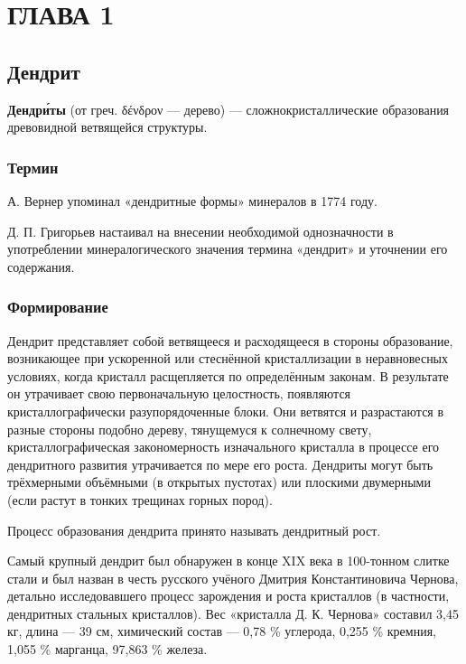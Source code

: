 \chapter{\label{ch:ch01}ГЛАВА 1} %

\section{Дендрит}

\textbf{Дендри́ты} (от греч. δένδρον — дерево) — сложнокристаллические образования древовидной ветвящейся структуры.

\subsection{Термин}

А. Вернер упоминал «дендритные формы» минералов в 1774 году.

Д. П. Григорьев настаивал на внесении необходимой однозначности в употреблении минералогического значения термина «дендрит» и уточнении его содержания.

\subsection{Формирование}

Дендрит представляет собой ветвящееся и расходящееся в стороны образование, возникающее при ускоренной или стеснённой кристаллизации в неравновесных условиях, когда кристалл расщепляется по определённым законам. В результате он утрачивает свою первоначальную целостность, появляются кристаллографически разупорядоченные блоки. Они ветвятся и разрастаются в разные стороны подобно дереву, тянущемуся к солнечному свету, кристаллографическая закономерность изначального кристалла в процессе его дендритного развития утрачивается по мере его роста. Дендриты могут быть трёхмерными объёмными (в открытых пустотах) или плоскими двумерными (если растут в тонких трещинах горных пород).

Процесс образования дендрита принято называть дендритный рост.

Самый крупный дендрит был обнаружен в конце XIX века в 100-тонном слитке стали и был назван в честь русского учёного Дмитрия Константиновича Чернова, детально исследовавшего процесс зарождения и роста кристаллов (в частности, дендритных стальных кристаллов). Вес «кристалла Д. К. Чернова» составил 3,45 кг, длина — 39 см, химический состав — 0,78 \% углерода, 0,255 \% кремния, 1,055 \% марганца, 97,863 \% железа.

